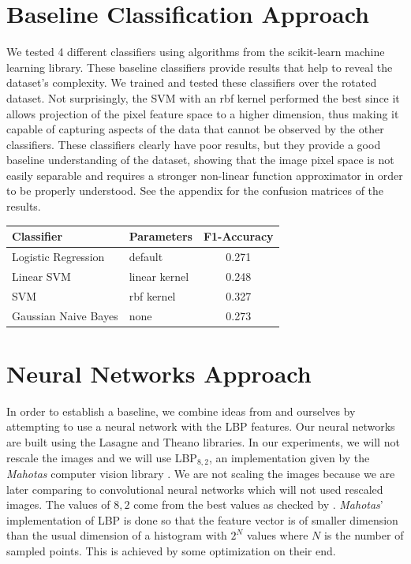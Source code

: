 \begin{multicols}{2}
\section{Baseline Classification Approach}
We tested 4 different classifiers using algorithms from the scikit-learn \citet{scikit-learn} machine learning library. These baseline classifiers provide results that help to reveal the dataset's complexity. We trained and tested these classifiers over the rotated dataset. Not surprisingly, the SVM with an rbf kernel performed the best since it allows projection of the pixel feature space to a higher dimension, thus making it capable of capturing aspects of the data that cannot be observed by the other classifiers. These classifiers clearly have poor results, but they provide a good baseline understanding of the dataset, showing that the image pixel space is not easily separable and requires a stronger non-linear function approximator in order to be properly understood. See the appendix for the confusion matrices of the results.

\begin{adjustbox}{max width=\textwidth}
	\begin{tabular}{llc}
	\toprule
	\textbf{Classifier} & \textbf{Parameters} & \textbf{F1-Accuracy} \\ \midrule
	Logistic Regression  & default         & 0.271 \\ 
	Linear 	SVM   	     & linear kernel   & 0.248 \\
	SVM                  & rbf kernel      & 0.327 \\
	Gaussian Naive Bayes & none            & 0.273 \\ \bottomrule
	\end{tabular}
\end{adjustbox}

\section{Neural Networks Approach}
In order to establish a baseline, we combine ideas from \citet{kylberg2011virus} and ourselves by attempting to use a neural network with the LBP features. Our neural networks are built using the Lasagne and Theano \cite{Bastien-Theano-2012, bergstra+al:2010-scipy} libraries. In our experiments, we will not rescale the images and we will use LBP$_{8,2}$, an implementation given by the \emph{Mahotas} computer vision library \citet{coelho2012mahotas}. We are not scaling the images because we are later comparing to convolutional neural networks which will not used rescaled images. The values of $8,2$ come from the best values as checked by \citet{kylberg2011virus}. \emph{Mahotas}' implementation of LBP is done so that the feature vector is of smaller dimension than the usual dimension of a histogram with $2^N$ values where $N$ is the number of sampled points. This is achieved by some optimization on their end. 

\end{multicols}
